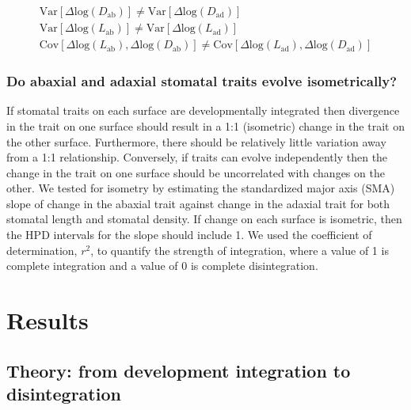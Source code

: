 \documentclass[
  12pt,
]{article}
\begin{document}
\begin{gather}\label{eq:prediction1}
\text{Var}[\Delta \text{log}(D_\text{ab})] \ne \text{Var}[\Delta \text{log}(D_\text{ad})] \\
\text{Var}[\Delta \text{log}(L_\text{ab})] \ne \text{Var}[\Delta \text{log}(L_\text{ad})] \\
\text{Cov}[\Delta \text{log}(L_\text{ab}), \Delta \text{log}(D_\text{ab})] \ne \text{Cov}[\Delta \text{log}(L_\text{ad}), \Delta \text{log}(D_\text{ad})]
\end{gather}

\hypertarget{do-abaxial-and-adaxial-stomatal-traits-evolve-isometrically}{%
\subsubsection{Do abaxial and adaxial stomatal traits evolve isometrically?}\label{do-abaxial-and-adaxial-stomatal-traits-evolve-isometrically}}

If stomatal traits on each surface are developmentally integrated then divergence in the trait on one surface should result in a 1:1 (isometric) change in the trait on the other surface. Furthermore, there should be relatively little variation away from a 1:1 relationship. Conversely, if traits can evolve independently then the change in the trait on one surface should be uncorrelated with changes on the other. We tested for isometry by estimating the standardized major axis (SMA) slope of change in the abaxial trait against change in the adaxial trait for both stomatal length and stomatal density. If change on each surface is isometric, then the HPD intervals for the slope should include 1. We used the coefficient of determination, \(r^2\), to quantify the strength of integration, where a value of 1 is complete integration and a value of 0 is complete disintegration.

\hypertarget{results}{%
\section{Results}\label{results}}

\hypertarget{theory-from-development-integration-to-disintegration}{%
\subsection{Theory: from development integration to disintegration}\label{theory-from-development-integration-to-disintegration}}
\end{document}
